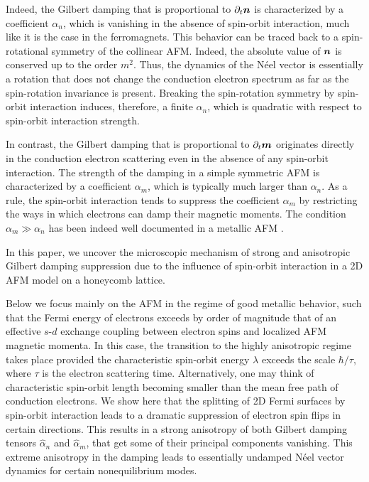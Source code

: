 Indeed, the Gilbert damping that is proportional to $\partial_t\boldsymbol{n}$ is characterized by a coefficient $\alpha_n$, which is vanishing in the absence of spin-orbit interaction, much like it is the case in the ferromagnets. This behavior can be traced back to a spin-rotational symmetry of the collinear AFM. Indeed, the absolute value of $\boldsymbol{n}$ is conserved up to the order $m^2$. Thus, the dynamics of the N\'eel vector is essentially a rotation that does not change the conduction electron spectrum as far as the spin-rotation invariance is present. Breaking the spin-rotation symmetry by spin-orbit interaction induces, therefore, a finite $\alpha_n$, which is quadratic with respect to spin-orbit interaction strength.

In contrast, the Gilbert damping that is proportional to $\partial_t\boldsymbol{m}$ originates directly in the conduction electron scattering even in the absence of any spin-orbit interaction. The strength of the damping in a simple symmetric AFM is characterized by a coefficient $\alpha_m$, which is typically much larger than $\alpha_n$. As a rule, the spin-orbit interaction tends to suppress the coefficient $\alpha_m$ by restricting the ways in which electrons can damp their magnetic moments.  The condition $\alpha_m \gg \alpha_n$ has been indeed well documented in a metallic AFM \cite{PhysRevMaterials.1.061401, Mahfouzi2018a}. 

In this paper, we uncover the microscopic mechanism of strong and anisotropic Gilbert damping suppression due to the influence of spin-orbit interaction in a 2D AFM model on a honeycomb lattice. 

Below we focus mainly on the AFM in the regime of good metallic behavior, such that the Fermi energy of electrons exceeds by order of magnitude that of an effective $s$-$d$ exchange coupling between electron spins and localized AFM magnetic momenta.  In this case, the transition to the highly anisotropic regime takes place provided the characteristic spin-orbit energy $\lambda$ exceeds the scale $\hbar/\tau$, where $\tau$ is the electron scattering time. Alternatively, one may think of characteristic spin-orbit length becoming smaller than the mean free path of conduction electrons.  We show here that the splitting of 2D Fermi surfaces by spin-orbit interaction leads to a dramatic suppression of electron spin flips in certain directions. This results in a strong anisotropy of both Gilbert damping tensors $\hat{\alpha}_n$ and $\hat{\alpha}_m$, that get some of their principal components vanishing. This extreme anisotropy in the damping leads to essentially undamped N\'eel vector dynamics for certain nonequilibrium modes. 

